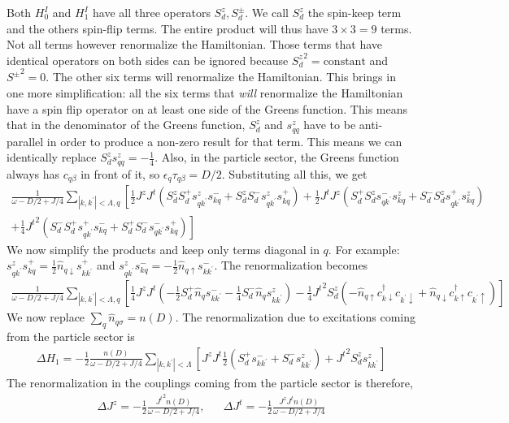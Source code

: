 \documentclass[12pt]{revtex4-2}
\begin{document}
Both \(H^I_0\) and \(H^I_1\) have all three operators \(S_d^z, S_d^\pm\). We call \(S_d^z\) the spin-keep term and the others spin-flip terms. The entire product will thus have \(3\times 3 = 9\) terms. Not all terms however renormalize the Hamiltonian. Those terms that have identical operators on both sides can be ignored because \({S_d^z}^2 = \text{constant}\) and \({S^\pm}^2 = 0\). The other six terms will renormalize the Hamiltonian. This brings in one more simplification: all the six terms that \textit{will} renormalize the Hamiltonian have a spin flip operator on at least one side of the Greens function. This means that in the denominator of the Greens function, \(S_d^z\) and \(s^z_{qq}\) have to be anti-parallel in order to produce a non-zero result for that term. This means we can identically replace \(S_d^z s^z_{qq} = -\frac{1}{4}\). Also, in the particle sector, the Greens function always has \(c_{q\beta}\) in front of it, so \(\epsilon_q \tau_{q\beta} = D/2\). Substituting all this, we get
\begin{align}
	\frac{1}{\omega - D/2 + J/4}\sum_{|k,k^\prime|<\Lambda,q}\left[\frac{1}{2}J^z J^t \left(S_d^z S_d^+ s^z_{qk^\prime}s^-_{kq} + S_d^z S_d^- s^z_{qk^\prime}s^+_{kq}\right) + \frac{1}{2}J^t J^z \left(S_d^+ S_d^z s^-_{qk^\prime}s^z_{kq} + S_d^- S_d^z s^+_{qk^\prime}s^z_{kq}\right)\right.\\
+\left.\frac{1}{4}{J^t}^2 \left(S_d^- S_d^+ s^+_{qk^\prime}s^-_{kq} + S_d^+ S_d^- s^-_{qk^\prime}s^+_{kq}\right)\right]
\end{align}
We now simplify the products and keep only terms diagonal in \(q\). For example: \(s^z_{qk^\prime}s^+_{kq} = \frac{1}{2}\hat n_{q \downarrow}s^+_{kk^\prime}\) and \(s^z_{qk^\prime}s^-_{kq} = -\frac{1}{2}\hat n_{q \uparrow}s^-_{kk^\prime}\). The renormalization becomes
\begin{align}
	\frac{1}{\omega - D/2 + J/4}\sum_{|k,k^\prime|<\Lambda,q}\left[\frac{1}{4}J^z J^t \left(-\frac{1}{2}S_d^+ \hat n_{q}s^-_{kk^\prime} - \frac{1}{4}S_d^- \hat n_{q} s^z_{kk^\prime}\right) - \frac{1}{4}{J^t}^2 S_d^z\left(-\hat n_{q \uparrow}c^\dagger_{k \downarrow}c_{k^\prime \downarrow} + \hat n_{q \downarrow}c^\dagger_{k \uparrow}c_{k^\prime \uparrow}\right)\right]
\end{align}
We now replace \(\sum_q \hat n_{q\sigma} = n(D)\). The renormalization due to excitations coming from the particle sector is
\begin{align}
	\Delta H_1 = -\frac{1}{2}\frac{n(D)}{\omega - D/2 + J/4}\sum_{|k,k^\prime|<\Lambda}\left[J^z J^t \frac{1}{2}\left(S_d^+ s^-_{kk^\prime} + S_d^- s^z_{kk^\prime}\right) + {J^t}^2 S_d^z s^z_{kk^\prime}\right]
\end{align}
The renormalization in the couplings coming from the particle sector is therefore,
\begin{align}
	\label{kondo_part}
	\Delta J^z = -\frac{1}{2}\frac{{J^t}^2n(D)}{\omega - D/2 + J/4}, && \Delta J^t = -\frac{1}{2}\frac{J^z J^tn(D)}{\omega - D/2 + J/4}
\end{align}
\end{document}
